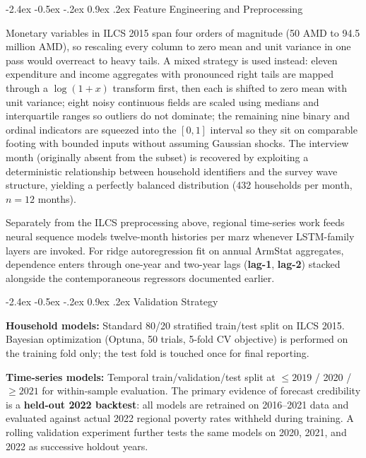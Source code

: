 \documentclass[12pt]{article}
\makeatletter
\renewcommand\subsection{%
  \@startsection{subsection}{2}{\z@}%
    {-2.4ex \@plus -0.5ex \@minus -.2ex}%
    {0.9ex \@plus .2ex}%
    {\color{steelblue}\normalsize\bfseries}}
\makeatother
\begin{document}
\subsection{Feature Engineering and Preprocessing}

\indent\hspace*{1em}
Monetary variables in ILCS 2015 span four orders of magnitude (50 AMD to
94.5 million AMD), so rescaling every column to zero mean and unit variance in one pass would overreact to heavy tails. A mixed strategy is used instead:
eleven expenditure and income aggregates with pronounced right tails are mapped through a $\log(1+x)$
transform first, then each is shifted to zero mean with unit variance; eight noisy continuous fields are scaled using medians and interquartile ranges so outliers do not dominate; the remaining nine binary and ordinal indicators are squeezed into the $[0,1]$ interval so they sit on comparable footing with bounded inputs without assuming Gaussian shocks. The interview month (originally absent from the subset)
is recovered by exploiting a deterministic relationship between household
identifiers and the survey wave structure, yielding a perfectly balanced
distribution (432 households per month, $n=12$ months).

\vspace{0.35em}
\indent\hspace*{1em}
Separately from the ILCS preprocessing above, regional time-series work feeds neural
sequence models twelve-month histories per marz whenever LSTM-family layers are invoked.
For ridge autoregression fit on annual ArmStat aggregates, dependence enters through
one-year and two-year lags (\textbf{lag-1}, \textbf{lag-2}) stacked alongside the contemporaneous regressors documented earlier.

\subsection{Validation Strategy}

\vspace{0.3em}
\noindent\textbf{Household models:} Standard 80/20 stratified train/test split
on ILCS 2015. Bayesian optimization (Optuna, 50 trials, 5-fold CV objective) is
performed on the training fold only; the test fold is touched once for final
reporting.

\vspace{0.3em}
\noindent\textbf{Time-series models:} Temporal train/validation/test split at
$\leq\!2019$ / 2020 / $\geq\!2021$ for within-sample evaluation. The primary
evidence of forecast credibility is a \textbf{held-out 2022 backtest}: all
models are retrained on 2016--2021 data and evaluated against actual 2022
regional poverty rates withheld during training. A rolling validation experiment
further tests the same models on 2020, 2021, and 2022 as successive holdout
years.
\end{document}
